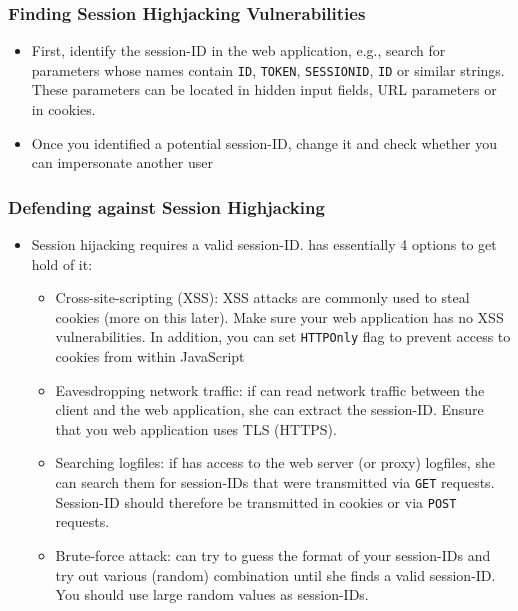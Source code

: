 \begin{frame}
    \frametitle{Finding Session Highjacking Vulnerabilities}
    \begin{itemize}
        \item First, identify the session-ID in the web application, e.g., search for parameters whose names contain \texttt{ID}, \texttt{TOKEN}, \texttt{SESSIONID}, \texttt{ID} or similar strings. These parameters can be located in hidden input fields, URL parameters or in cookies.
        \item Once you identified a potential session-ID, change it and check whether you can impersonate another user
    \end{itemize}
\end{frame}

\begin{frame}
    \frametitle{Defending against Session Highjacking}
    \begin{itemize}
        \item Session hijacking requires a valid session-ID. \Attacker has essentially 4 options to get hold of it:
        \begin{itemize}
            \item Cross-site-scripting (XSS): XSS attacks are commonly used to steal cookies (more on this later). Make sure your web application has no XSS vulnerabilities. In addition, you can set \texttt{HTTPOnly} flag to prevent access to cookies from within JavaScript 
            \item Eavesdropping network traffic: if \attacker can read network traffic between the client and the web application, she can extract the session-ID. Ensure that you web application uses TLS (HTTPS).
            \item Searching logfiles: if \attacker has access to the web server (or proxy) logfiles, she can search them for session-IDs that were transmitted via \texttt{GET} requests. Session-ID should therefore be transmitted in cookies or via \texttt{POST} requests.  
            \item Brute-force attack: \attacker can try to guess the format of your session-IDs and try out various (random) combination until she finds a valid session-ID. You should use large random values as session-IDs.
        \end{itemize}
    \end{itemize}
\end{frame}

